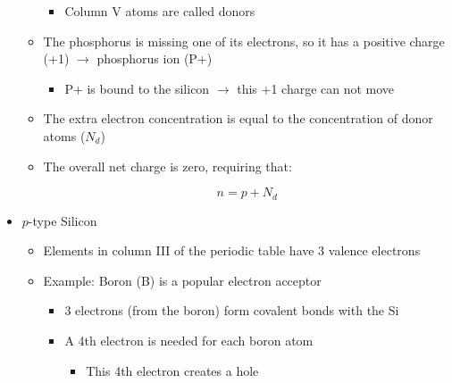\begin{itemize}
\begin{itemize}
        \begin{itemize}

          \item Column V atoms are called donors

        \end{itemize}

      \item The phosphorus is missing one of its electrons, so it has a positive charge (+1) $\to$ phosphorus ion (P+)

        \begin{itemize}

          \item P+ is bound to the silicon $\to$ this +1 charge can not move

        \end{itemize}

      \item The extra electron concentration is equal to the concentration of donor atoms ($N_d$)

      \item The overall net charge is zero, requiring that:

        $$n=p+N_d$$

    \end{itemize}

  \item $p$-type Silicon

    \begin{itemize}

      \item Elements in column III of the periodic table have 3 valence electrons

      \item Example: Boron (B) is a popular electron acceptor

        \begin{itemize}

          \item 3 electrons (from the boron) form covalent bonds with the Si

          \item A 4th electron is needed for each boron atom

            \begin{itemize}

              \item This 4th electron creates a hole

            \end{itemize}


\end{itemize}
\end{itemize}
\end{itemize}
